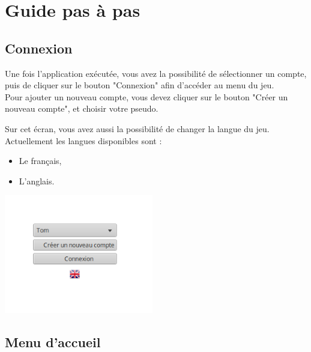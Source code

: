 \documentclass[a4paper, 12pt]{report}
\begin{document}
\chapter{Guide pas à pas}
\thispagestyle{empty}
\thispagestyle{plain}

	\section{Connexion}

        Une fois l'application exécutée, vous avez la possibilité de sélectionner un compte, puis de cliquer sur le bouton "Connexion" afin d'accéder au menu du jeu. \\
        Pour ajouter un nouveau compte, vous devez cliquer sur le bouton "Créer un nouveau compte", et choisir votre pseudo.
        
        Sur cet écran, vous avez aussi la possibilité de changer la langue du jeu. Actuellement les langues disponibles sont :
        \begin{itemize}
            \item Le français,
            \item L'anglais.
        \end{itemize}
        
        \begin{minipage}{\linewidth}
                    \centering
			        \includegraphics[width=6.5cm]{screenMenuCo.png}
	    \end{minipage}

	\section{Menu d'accueil}
\end{document}

